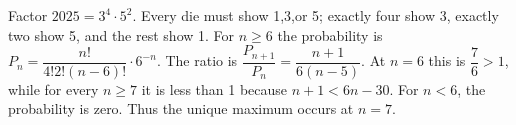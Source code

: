 Factor $2025=3^4\cdot5^2$. Every die must show 1,3,or 5; exactly four show 3, exactly two show 5, and the rest show 1. For $n\ge6$ the probability is $P_n=\dfrac{n!}{4!2!(n-6)!}\cdot6^{-n}$. The ratio is $\dfrac{P_{n+1}}{P_n}=\dfrac{n+1}{6(n-5)}$. At $n=6$ this is $\dfrac{7}{6}>1$, while for every $n\ge7$ it is less than 1 because $n+1<6n-30$. For $n<6$, the probability is zero. Thus the unique maximum occurs at $\boxed{n=7}$.
